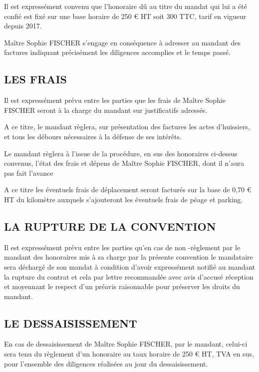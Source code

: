 \documentclass[
  11pt,
]{letter}
\begin{document}
\begin{letter}{}
Il est expressément convenu que l'honoraire dû au titre du mandat qui
lui a été confié est fixé sur une base horaire de 250 € HT soit 300 TTC,
tarif en vigueur depuis 2017.

Maître Sophie FISCHER s'engage en conséquence à adresser au mandant des
factures indiquant précisément les diligences accomplies et le temps
passé.

\hypertarget{les-frais}{%
\subsection{LES FRAIS}\label{les-frais}}

Il est expressément prévu entre les parties que les frais de Maître
Sophie FISCHER seront à la charge du mandant sur justificatifs adressés.

A ce titre, le mandant règlera, sur présentation des factures les actes
d'huissiers, et tous les débours nécessaires à la défense de ses
intérêts.

Le mandant règlera à l'issue de la procédure, en sus des honoraires
ci-dessus convenus, l'état des frais et dépens de Maître Sophie FISCHER,
dont il n'aura pas fait l'avance

A ce titre les éventuels frais de déplacement seront facturés sur la
base de 0,70 € HT du kilomètre auxquels s'ajouteront les éventuels frais
de péage et parking.

\hypertarget{la-rupture-de-la-convention}{%
\subsection{LA RUPTURE DE LA
CONVENTION}\label{la-rupture-de-la-convention}}

Il est expressément prévu entre les parties qu'en cas de non -règlement
par le mandant des honoraires mis à sa charge par la présente convention
le mandataire sera déchargé de son mandat à condition d'avoir
expressément notifié au mandant la rupture du contrat et cela par lettre
recommandée avec avis d'accusé réception et moyennant le respect d'un
préavis raisonnable pour préserver les droits du mandant.

\hypertarget{le-dessaisissement}{%
\subsection{LE DESSAISISSEMENT}\label{le-dessaisissement}}

En cas de dessaisissement de Maître Sophie FISCHER, par le mandant,
celui-ci sera tenu du règlement d'un honoraire au taux horaire de 250 €
HT, TVA en sus, pour l'ensemble des diligences réalisées au jour du
dessaisissement.


\end{letter}
\end{document}
